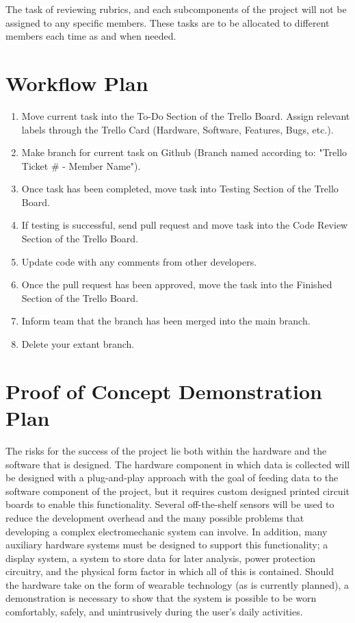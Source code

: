 \documentclass[12pt]{article}
\begin{document}
The task of reviewing rubrics, and each subcomponents of the project will not be assigned to any specific members. These tasks are to be allocated to different members each time as and when needed.\\

\pagebreak

\section{Workflow Plan}
\begin{enumerate}
\item Move current task into the To-Do Section of the Trello Board. Assign relevant labels through the Trello Card (Hardware, Software, Features, Bugs, etc.).
\item Make branch for current task on Github (Branch named according to: "Trello Ticket \# - Member Name").
\item Once task has been completed, move task into Testing Section of the Trello Board.
\item If testing is successful, send pull request and move task into the Code Review Section of the Trello Board.
\item Update code with any comments from other developers.
\item Once the pull request has been approved, move the task into the Finished Section of the Trello Board.
\item Inform team that the branch has been merged into the main branch.
\item Delete your extant branch.
\end{enumerate}



\section{Proof of Concept Demonstration Plan}

The risks for the success of the project lie both within the hardware and the software that is designed. The hardware component in which data is collected will be designed with a plug-and-play approach with the goal of feeding data to the software component of the project, but it requires custom designed printed circuit boards to enable this functionality. Several off-the-shelf sensors will be used to reduce the development overhead and the many possible problems that developing a complex electromechanic system can involve. In addition, many auxiliary hardware systems must be designed to support this functionality; a display system, a system to store data for later analysis, power protection circuitry, and the physical form factor in which all of this is contained. Should the hardware take on the form of wearable technology (as is currently planned), a demonstration is necessary to show that the system is possible to be worn comfortably, safely, and unintrusively during the user's daily activities.\\
\end{document}
